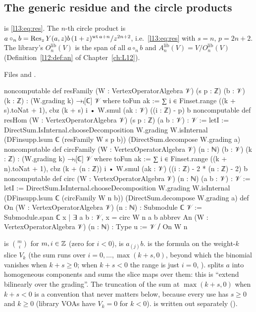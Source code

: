 \subsection{The generic residue and the circle products}

\begin{definition}\label{l13:def:circ}
 is \eqref{l13:eq:res}. The $n$-th circle product is $a\circ_nb = \operatorname{Res}_zY(a,z)b\,(1+z)^{\operatorname{wt} a+n}/z^{2n+2}$,
i.e.\ \eqref{l13:eq:res} with $s = n$, $p = 2n+2$. The library's $O_n^{\mathrm{lib}}(V)$ is the span of all $a\circ_nb$ and
$A_n^{\mathrm{lib}}(V) = V/O_n^{\mathrm{lib}}(V)$ (Definition~\ref{l12:def:an} of Chapter~\ref{ch:L12}).
\end{definition}
\noindent Files  and
.
\begin{leancode}
noncomputable def resFamily (W : VertexOperatorAlgebra 𝒱) (s p : ℤ) (b : 𝒱) (k : ℤ) :
    (W.grading k) →ₗ[ℂ] 𝒱 where
  toFun ak := ∑ i ∈ Finset.range ((k + s).toNat + 1),
    cbz (k + s) i • W.smul (ak : 𝒱) ((i : ℤ) - p) b
noncomputable def resHom (W : VertexOperatorAlgebra 𝒱) (s p : ℤ) (a b : 𝒱) : 𝒱 :=
  letI := DirectSum.IsInternal.chooseDecomposition W.grading W.isInternal
  (DFinsupp.lsum ℂ (resFamily W s p b)) (DirectSum.decompose W.grading a)
noncomputable def circFamily (W : VertexOperatorAlgebra 𝒱) (n : ℕ) (b : 𝒱) (k : ℤ) :
    (W.grading k) →ₗ[ℂ] 𝒱 where
  toFun ak := ∑ i ∈ Finset.range ((k + n).toNat + 1),
    cbz (k + (n : ℤ)) i • W.smul (ak : 𝒱) ((i : ℤ) - 2 * (n : ℤ) - 2) b
noncomputable def circ (W : VertexOperatorAlgebra 𝒱) (n : ℕ) (a b : 𝒱) : 𝒱 :=
  letI := DirectSum.IsInternal.chooseDecomposition W.grading W.isInternal
  (DFinsupp.lsum ℂ (circFamily W n b)) (DirectSum.decompose W.grading a)
def On (W : VertexOperatorAlgebra 𝒱) (n : ℕ) : Submodule ℂ 𝒱 :=
  Submodule.span ℂ {x | ∃ a b : 𝒱, x = circ W n a b}
abbrev An (W : VertexOperatorAlgebra 𝒱) (n : ℕ) : Type u := 𝒱 ⧸ On W n
\end{leancode}

\begin{dictionary}
 is $\binom mi$ for $m,i\in{\mathbb{Z}}$ (zero for $i<0$),  is $a_{(j)}b$. 
is the formula on the weight-$k$ slice $V_k$ (the sum runs over $i = 0,\dots,\max(k+s,0)$, beyond which the binomial
vanishes when $k+s\ge0$; when $k+s<0$ the range is just $i=0$, ). 
splits $a$ into homogeneous components and  sums the slice maps over them: this is ``extend bilinearly over
the grading''. The truncation of the sum at $\max(k+s,0)$ when $k+s<0$ is a convention that never matters below, because
every use has $s\ge0$ and $k\ge0$ (library VOAs have $V_k = 0$ for $k<0$).  is  written
out separately ().
\end{dictionary}

